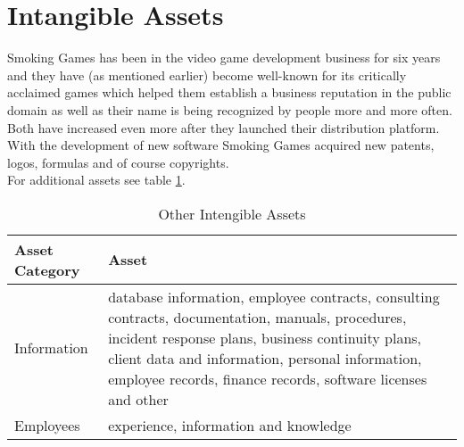 \section{Intangible Assets}
Smoking Games has been in the video game development business for six years and they have (as mentioned earlier) become well-known for its critically acclaimed games which helped them establish a business reputation in the public domain as well as their name is being recognized by people more and more often. Both have increased even more after they launched their distribution platform.\\
With the development of new software Smoking Games acquired new patents, logos, formulas and of course copyrights.\\
For additional assets see table \ref{tab:OtherTangibleAssets}.
\begin{table}[h]
	\centering
	\begin{tabular}{l | l}
		\textbf{Asset Category} & \textbf{Asset}\\\hline\hline
		Information & \parbox[t]{7cm}{database information, employee contracts, consulting contracts, documentation,
manuals, procedures, incident response plans, business continuity plans, client data and
information, personal information, employee records, finance records, software licenses
and other}\\\hline
		Employees & \parbox[t]{7cm}{experience, information and knowledge}
	\end{tabular}
	\caption{Other Intengible Assets}\label{tab:OtherTangibleAssets}
\end{table}